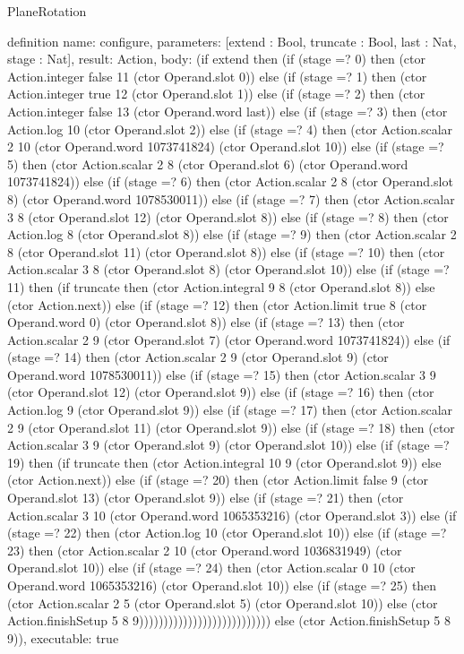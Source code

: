 \begin{lexlean}{PlaneRotation}
\begin{semanticmodule}
definition{
  name: configure,
  parameters: [extend : Bool, truncate : Bool, last : Nat, stage : Nat],
  result: Action,
  body: (if extend then (if (stage =? 0) then (ctor Action.integer false 11 (ctor Operand.slot 0)) else (if (stage =? 1) then (ctor Action.integer true 12 (ctor Operand.slot 1)) else (if (stage =? 2) then (ctor Action.integer false 13 (ctor Operand.word last)) else (if (stage =? 3) then (ctor Action.log 10 (ctor Operand.slot 2)) else (if (stage =? 4) then (ctor Action.scalar 2 10 (ctor Operand.word 1073741824) (ctor Operand.slot 10)) else (if (stage =? 5) then (ctor Action.scalar 2 8 (ctor Operand.slot 6) (ctor Operand.word 1073741824)) else (if (stage =? 6) then (ctor Action.scalar 2 8 (ctor Operand.slot 8) (ctor Operand.word 1078530011)) else (if (stage =? 7) then (ctor Action.scalar 3 8 (ctor Operand.slot 12) (ctor Operand.slot 8)) else (if (stage =? 8) then (ctor Action.log 8 (ctor Operand.slot 8)) else (if (stage =? 9) then (ctor Action.scalar 2 8 (ctor Operand.slot 11) (ctor Operand.slot 8)) else (if (stage =? 10) then (ctor Action.scalar 3 8 (ctor Operand.slot 8) (ctor Operand.slot 10)) else (if (stage =? 11) then (if truncate then (ctor Action.integral 9 8 (ctor Operand.slot 8)) else (ctor Action.next)) else (if (stage =? 12) then (ctor Action.limit true 8 (ctor Operand.word 0) (ctor Operand.slot 8)) else (if (stage =? 13) then (ctor Action.scalar 2 9 (ctor Operand.slot 7) (ctor Operand.word 1073741824)) else (if (stage =? 14) then (ctor Action.scalar 2 9 (ctor Operand.slot 9) (ctor Operand.word 1078530011)) else (if (stage =? 15) then (ctor Action.scalar 3 9 (ctor Operand.slot 12) (ctor Operand.slot 9)) else (if (stage =? 16) then (ctor Action.log 9 (ctor Operand.slot 9)) else (if (stage =? 17) then (ctor Action.scalar 2 9 (ctor Operand.slot 11) (ctor Operand.slot 9)) else (if (stage =? 18) then (ctor Action.scalar 3 9 (ctor Operand.slot 9) (ctor Operand.slot 10)) else (if (stage =? 19) then (if truncate then (ctor Action.integral 10 9 (ctor Operand.slot 9)) else (ctor Action.next)) else (if (stage =? 20) then (ctor Action.limit false 9 (ctor Operand.slot 13) (ctor Operand.slot 9)) else (if (stage =? 21) then (ctor Action.scalar 3 10 (ctor Operand.word 1065353216) (ctor Operand.slot 3)) else (if (stage =? 22) then (ctor Action.log 10 (ctor Operand.slot 10)) else (if (stage =? 23) then (ctor Action.scalar 2 10 (ctor Operand.word 1036831949) (ctor Operand.slot 10)) else (if (stage =? 24) then (ctor Action.scalar 0 10 (ctor Operand.word 1065353216) (ctor Operand.slot 10)) else (if (stage =? 25) then (ctor Action.scalar 2 5 (ctor Operand.slot 5) (ctor Operand.slot 10)) else (ctor Action.finishSetup 5 8 9))))))))))))))))))))))))))) else (ctor Action.finishSetup 5 8 9)),
  executable: true
}


\end{semanticmodule}
\end{lexlean}
